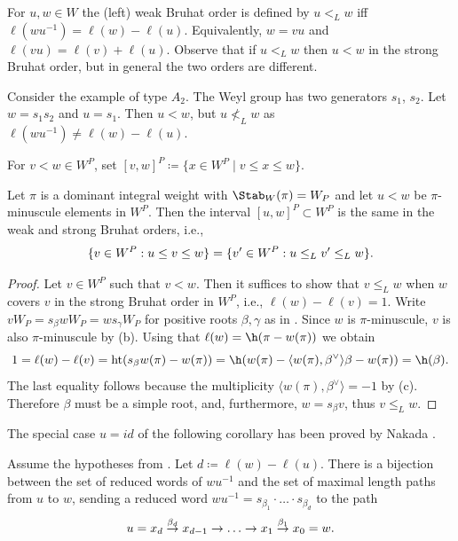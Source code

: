 For $u,w \in W$ the (left) weak Bruhat order is defined by $u<_L w$ iff 
$\ell(wu^{-1}) = \ell(w) - \ell(u)$. Equivalently, $w=vu$ and $\ell(vu) = \ell(v) + \ell(u)$. 
Observe that if $u<_L w$ then $u<w$ in the strong Bruhat order, but in general the 
two orders are different. 
	\begin{example}
		Consider the example of type $A_2$. The Weyl group has two generators $s_1$, $s_2$. Let $w=s_1s_2$ and $u=s_1$. Then $u<w$, but $u \nless_L w$ as $\ell(wu^{-1}) \neq \ell(w)-\ell(u)$.
\end{example}
For $v<w\in W^P$, set $[v, w]^P\coloneqq \{x\in W^P\mid v\leq x\leq w\}$. 
\begin{prop}\label{prop:weakstrong} Let $\pi$ is a dominant integral weight 
	with $\Stab_W(\pi)=W_P$
	and let $u<w$ be $\pi$-minuscule elements in $W^P$. Then the interval
	$[u,w]^P \subset W^P$ is the same in the weak and strong Bruhat orders, i.e.,
	\[ \{ v \in W^P: u \le v \le w \} = \{ v' \in W^P: u \le_L v' \le_L w \} \/. \] 
\end{prop}
\begin{proof} Let $v \in W^P$ such that $v < w$. Then it suffices to show that 
	$v \le_L w$ when $w$ covers $v$ in the strong Bruhat order in $W^P$, i.e., 
	$\ell(w) - \ell(v) =1$. Write
	$v W_P= s_\beta w W_P = w s_\gamma W_P$ for positive roots $\beta, \gamma$ as in 
	. Since $w$ is $\pi$-minuscule, $v$ is also $\pi$-minuscule 
	by  (b).
	Using that $\ell(w)= \h(\pi - w(\pi))$ we obtain 
	\[ 1 = \ell(w) - \ell(v) = \mathrm{ht}(s_\beta w(\pi) - w(\pi)) = 
	\h(w(\pi) - \langle w(\pi), \beta^\vee\rangle \beta - w(\pi)) = \h(\beta) \/.\]
	The last equality follows because the multiplicity $\langle w(\pi), \beta^\vee\rangle =-1$ 
	by (c). Therefore $\beta$ must be a simple root, and, furthermore, $w=s_\beta v$,
	thus $v \le_L w$. 
\end{proof}
The special case $u=id$ of the following corollary has been proved by Nakada
\cite[Proposition 10.3]{nakada:colored}.
\begin{corol}\label{cor:skewred} Assume the hypotheses from . Let \mbox{$d\coloneqq  \ell(w)-\ell(u)$}.
	There is a bijection between the set of reduced words of $wu^{-1}$ and the set of maximal length
	paths from $u$ to $w$, {sending a reduced word $wu^{-1} = s_{\beta_1} \cdot \ldots \cdot s_{\beta_d}$ to} the path
	\[ u=x_d\overset{\beta_d}{\to} x_{d-1}\to \ldots \to x_1\overset{\beta_1}{\to} x_0=w \/. \]
\end{corol}
